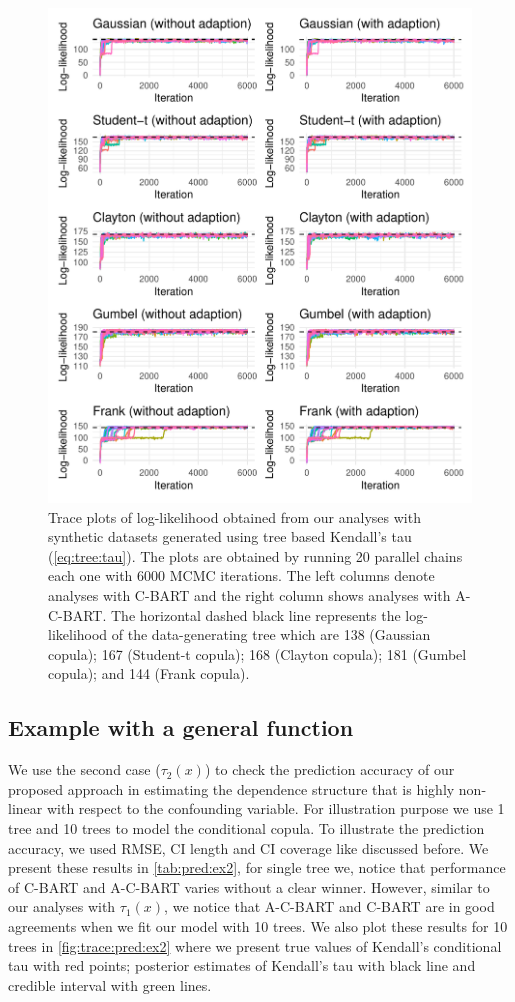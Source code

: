 \documentclass{amsart}
\begin{document}
\begin{figure}
	\centering
	\includegraphics[width = 0.95\linewidth]{"case_1_likelihood.pdf"}
	\caption{Trace plots of log-likelihood obtained from our analyses with synthetic datasets generated using tree based Kendall's tau (\cref{eq:tree:tau}). The plots are obtained by running 20 parallel chains each one with 6000 MCMC iterations. The left columns denote analyses with C-BART and the right column shows analyses with A-C-BART. The horizontal dashed black line represents the log-likelihood of the data-generating tree which are 138 (Gaussian copula); 167 (Student-t copula); 168 (Clayton copula); 181 (Gumbel copula); and 144 (Frank copula).}
	\label{fig:trace:like:ex1}
\end{figure}

\subsection{Example with a general function}
We use the second case ($\tau_2(x)$) to check the prediction accuracy of our proposed approach in estimating the dependence structure that is highly non-linear with respect to the confounding variable. For illustration purpose we use 1 tree and 10 trees to model the conditional copula. To illustrate the prediction accuracy, we used RMSE, CI length and CI coverage like discussed before. We present these results in \cref{tab:pred:ex2}, for single tree we, notice that performance of C-BART and A-C-BART varies without a clear winner. However, similar to our analyses with $\tau_1(x)$, we notice that A-C-BART and C-BART are in good agreements when we fit our model with 10 trees. We also plot these results for 10 trees in \cref{fig:trace:pred:ex2} where we present true values of Kendall's conditional tau with red points; posterior estimates of Kendall's tau with black line and credible interval with green lines. 
\end{document}
